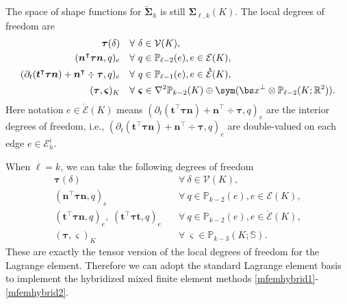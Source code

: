 The space of shape functions for $\widetilde{\boldsymbol\Sigma}_h$ is still $\boldsymbol \Sigma_{\ell,k}(K)$.
The local degrees of freedom are %
\begin{align*}
\boldsymbol \tau (\delta) & \quad\forall~\delta\in \mathcal V(K), \\%
(\boldsymbol  n^{\intercal}\boldsymbol \tau\boldsymbol  n, q)_e & \quad\forall~q\in\mathbb P_{\ell-2}(e),  e\in\mathcal E(K), \\%
(\partial_{t}(\boldsymbol  t^{\intercal}\boldsymbol \tau\boldsymbol  n)+\boldsymbol  n^{\intercal}\div\boldsymbol \tau, q)_e & \quad\forall~q\in\mathbb P_{\ell-1}(e),  e\in\mathring{\mathcal E}(K), \\%
(\boldsymbol \tau, \boldsymbol \varsigma)_K & \quad\forall~\boldsymbol \varsigma\in\nabla^2\mathbb P_{k-2}(K)\oplus \sym (\bs x^{\perp}\otimes \mathbb P_{\ell-2}(K;\mathbb R^2)). %
\end{align*}
Here notation $e\in\mathring{\mathcal E}(K)$ means $(\partial_{t}(\boldsymbol  t^{\intercal}\boldsymbol \tau\boldsymbol  n)+\boldsymbol  n^{\intercal}\div\boldsymbol \tau, q)_e$ are the interior degrees of freedom, i.e., $(\partial_{t}(\boldsymbol  t^{\intercal}\boldsymbol \tau\boldsymbol  n)+\boldsymbol  n^{\intercal}\div\boldsymbol \tau, q)_e$ are double-valued on each edge $e\in\mathcal E_h^i$.

When $\ell=k$, we can take the following degrees of freedom
\begin{align*}
\boldsymbol \tau (\delta) & \quad\forall~\delta\in \mathcal V(K), \\%
(\boldsymbol  n^{\intercal}\boldsymbol \tau\boldsymbol  n, q)_e & \quad\forall~q\in\mathbb P_{k-2}(e),  e\in\mathcal E(K), \\%
(\boldsymbol  t^{\intercal}\boldsymbol \tau\boldsymbol  n, q)_e,\; (\boldsymbol  t^{\intercal}\boldsymbol \tau\boldsymbol  t, q)_e & \quad\forall~q\in\mathbb P_{k-2}(e),  e\in\mathring{\mathcal E}(K), \\%
(\boldsymbol \tau, \boldsymbol \varsigma)_K & \quad\forall~\boldsymbol \varsigma\in \mathbb P_{k-3}(K;\mathbb S). %
\end{align*}
These are exactly the tensor version of the local degrees of freedom for the Lagrange element.
Therefore we can adopt the standard Lagrange element basis to implement the hybridized mixed finite element methods \eqref{mfemhybrid1}-\eqref{mfemhybrid2}.

